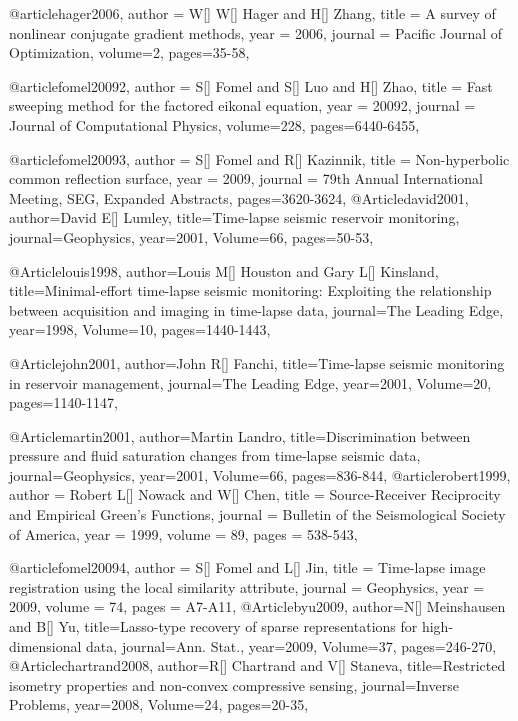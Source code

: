 @article{hager2006,
  author =	 {W[] W[] Hager and H[] Zhang},
  title =	 {A survey of nonlinear conjugate gradient methods},
  year =	 2006,
  journal =	 {Pacific Journal of Optimization},
  volume={2},
 pages=35-58,
}

@article{fomel20092,
  author =	 {S[] Fomel and S[] Luo and H[] Zhao},
  title =	 {Fast sweeping method for the factored eikonal equation},
  year =	 20092,
  journal =	 {Journal of Computational Physics},
  volume={228},
 pages=6440-6455,
}

@article{fomel20093,
  author =	 {S[] Fomel and R[] Kazinnik},
  title =	 {Non-hyperbolic common reflection surface},
  year =	 2009,
  journal =	 {79th Annual International Meeting, SEG, Expanded Abstracts},
 pages=3620-3624,
}
@Article{david2001,
  author={David E[] Lumley},
  title={Time-lapse seismic reservoir monitoring},
  journal={Geophysics},
  year=2001,
  Volume=66,
  pages={50-53},
}

@Article{louis1998,
  author={Louis M[] Houston and Gary L[] Kinsland},
  title={Minimal-effort time-lapse seismic monitoring: Exploiting the relationship between acquisition and imaging in time-lapse data},
  journal={The Leading Edge},
  year=1998,
  Volume=10,
  pages={1440-1443},
}

@Article{john2001,
  author={John R[] Fanchi},
  title={Time-lapse seismic monitoring in reservoir management},
  journal={The Leading Edge},
  year=2001,
  Volume=20,
  pages={1140-1147},
}

@Article{martin2001,
  author={Martin Landro},
  title={Discrimination between pressure and fluid saturation changes from time‐lapse seismic data},
  journal={Geophysics},
  year=2001,
  Volume=66,
  pages={836-844},
}
@article{robert1999,
  author =	 {Robert L[] Nowack and W[] Chen},
  title =	 {Source-Receiver Reciprocity and Empirical {G}reen's Functions},
  journal = 	 {Bulletin of the Seismological Society of America},
  year = 	 1999,
  volume =	 89,
  pages =	 {538-543},
}

@article{fomel20094,
  author =	 {S[] Fomel and L[] Jin},
  title =	 {Time-lapse image registration using the local similarity attribute},
  journal = 	 {Geophysics},
  year = 	 2009,
  volume =	 74,
  pages =	 {A7-A11},
}
@Article{byu2009,
  author={N[] Meinshausen and B[] Yu},
  title={Lasso-type recovery of sparse representations for high-dimensional data},
  journal={Ann. Stat.},
  year=2009,
  Volume=37,
  pages={246-270},
}
@Article{chartrand2008,
  author={R[] Chartrand and V[] Staneva},
  title={Restricted isometry properties and non-convex compressive sensing},
  journal={Inverse Problems},
  year=2008,
  Volume=24,
  pages={20-35},
}

